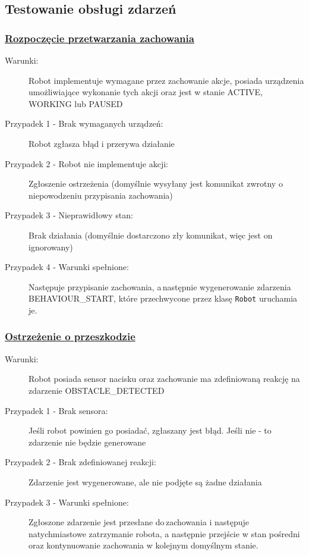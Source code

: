 \subsection{Testowanie obsługi zdarzeń}

\subsubsection{\underline{Rozpoczęcie przetwarzania zachowania}}


\begin{description}
    \item[Warunki:]Robot implementuje wymagane przez zachowanie akcje, posiada urządzenia umożliwiające wykonanie tych akcji oraz jest w stanie ACTIVE, WORKING lub PAUSED
    \item[Przypadek 1 - Brak wymaganych urządzeń:]Robot zgłasza błąd i przerywa działanie
        

    \item[Przypadek 2 - Robot nie implementuje akcji:]Zgłoszenie ostrzeżenia (domyślnie wysyłany jest komunikat zwrotny o niepowodzeniu przypisania zachowania)
        

    \item[Przypadek 3 - Nieprawidłowy stan:]Brak działania (domyślnie dostarczono zły komunikat, więc jest on ignorowany)
        

    \item[Przypadek 4 - Warunki spełnione:]Następuje przypisanie zachowania, a\,następnie wygenerowanie zdarzenia BEHAVIOUR\_START, które przechwycone przez klasę {\tt Robot} uruchamia je.
        
\end{description}

\subsubsection{\underline{Ostrzeżenie o przeszkodzie}}

\begin{description}
    \item[Warunki:]Robot posiada sensor nacisku oraz zachowanie ma zdefiniowaną reakcję na zdarzenie OBSTACLE\_DETECTED
    \item[Przypadek 1 - Brak sensora:]Jeśli robot powinien go posiadać, zgłaszany jest błąd. Jeśli nie - to zdarzenie nie będzie generowane
        
    \item[Przypadek 2 - Brak zdefiniowanej reakcji:]Zdarzenie jest wygenerowane, ale nie podjęte są żadne działania
        
    \item[Przypadek 3 - Warunki spełnione:]Zgłoszone zdarzenie jest przesłane do\,zachowania i następuje natychmiastowe zatrzymanie robota, a następnie przejście w stan pośredni oraz kontynuowanie zachowania w kolejnym domyślnym stanie.\\
        
\end{description}

